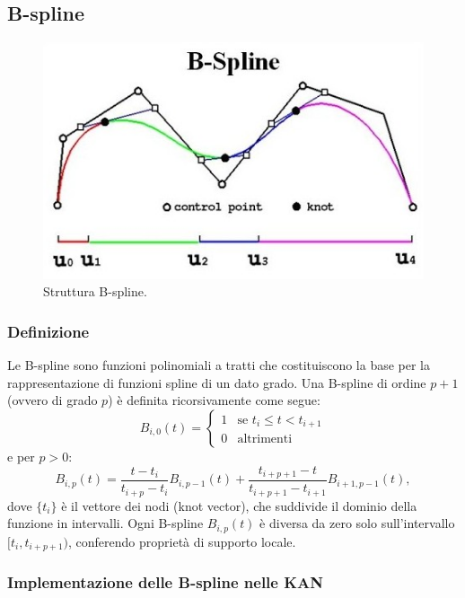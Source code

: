 \documentclass[a4paper,12pt]{report}
\begin{document}
	\subsection{B-spline}
	
	\begin{figure}[H]
		\centering
		\includegraphics[width=1.0\textwidth]{img/b_spline.jpg}
		\caption{Struttura B-spline.}
	\end{figure}
	
	\subsubsection{Definizione}
	Le B-spline sono funzioni polinomiali a tratti che costituiscono la base per la rappresentazione di funzioni spline di un dato grado. Una B-spline di ordine \(p+1\) (ovvero di grado \(p\)) è definita ricorsivamente come segue:
	\[
	B_{i,0}(t) = \begin{cases}
		1 & \text{se } t_i \leq t < t_{i+1} \\
		0 & \text{altrimenti}
	\end{cases}
	\]
	e per \(p > 0\):
	\[
	B_{i,p}(t) = \frac{t - t_i}{t_{i+p} - t_i} B_{i,p-1}(t) + \frac{t_{i+p+1} - t}{t_{i+p+1} - t_{i+1}} B_{i+1,p-1}(t),
	\]
	dove \(\{t_i\}\) è il vettore dei nodi (knot vector), che suddivide il dominio della funzione in intervalli. Ogni B-spline \(B_{i,p}(t)\) è diversa da zero solo sull'intervallo \([t_i, t_{i+p+1})\), conferendo proprietà di supporto locale.
	
	\subsubsection{Implementazione delle B-spline nelle KAN}
	
\end{document}
